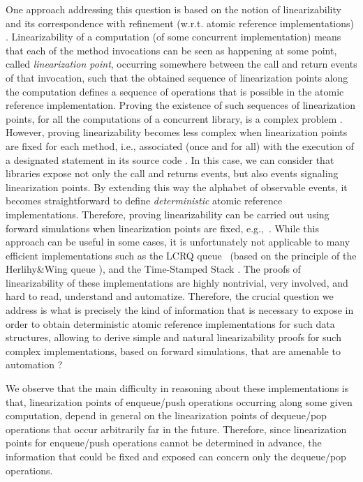 One approach addressing this question is based on the notion of linearizability \cite{journals/toplas/HerlihyW90} and its correspondence with refinement (w.r.t. atomic reference implementations) \cite{journals/tcs/FilipovicORY10,DBLP:conf/popl/BouajjaniEEH15}. Linearizability of a computation (of some concurrent implementation) means that each of the method invocations can be seen as happening at some point, called {\em linearization point}, occurring somewhere between the call and return events of that invocation, such that the obtained sequence of linearization points along the computation defines a sequence of operations that is possible in the atomic reference implementation. Proving the existence of such sequences of linearization points, for all the computations of a concurrent library, is a complex problem \cite{journals/iandc/AlurMP00,conf/esop/BouajjaniEEH13,DBLP:conf/netys/Hamza15}. 
%
However, proving linearizability becomes less complex when linearization points are fixed for each method, i.e., associated (once and for all) with the execution of a designated statement in its source code \cite{conf/esop/BouajjaniEEH13}. In this case, we can consider that libraries expose not only the call and returns events, but also events signaling linearization points. By extending this way the alphabet of observable events, it becomes straightforward to define {\em deterministic} atomic reference implementations. Therefore, proving linearizability can be carried out using forward simulations when linearization points are fixed, e.g.,~\cite{conf/ppopp/VafeiadisHHS06,conf/cav/AmitRRSY07,conf/vmcai/Vafeiadis09,conf/tacas/AbdullaHHJR13}.
%
While this approach can be useful in some cases, it is unfortunately not applicable to many efficient implementations such as the LCRQ queue~\cite{DBLP:conf/ppopp/MorrisonA13} (based on the principle of the Herlihy\&Wing queue \cite{journals/toplas/HerlihyW90}), and the Time-Stamped Stack \cite{DBLP:conf/popl/DoddsHK15}. The proofs of linearizability of these implementations are highly nontrivial, very involved, and hard to read, understand and automatize. Therefore, the crucial question we address is what is precisely the kind of information that is necessary to expose in order to obtain deterministic atomic reference implementations for such data structures, allowing to derive simple and natural linearizability proofs for such complex implementations, based on forward simulations, that are amenable to automation ?

We observe that the main difficulty in reasoning about these implementations is that, linearization points of enqueue/push operations occurring along some given computation, depend in general on the linearization points of dequeue/pop operations that occur arbitrarily far in the future. Therefore, since linearization points for enqueue/push operations cannot be determined in advance, the information that could be fixed and exposed can concern only the dequeue/pop operations. 

